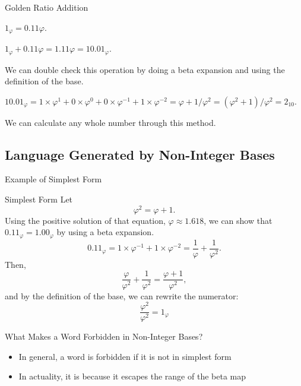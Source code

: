 \documentclass{beamer}
\begin{document}
\begin{frame}{Golden Ratio Addition}
  \begin{example}\pause
    $1_\varphi = 0.11\varphi.$\pause

    $1_\varphi + 0.11\varphi = 1.11\varphi = 10.01_\varphi.$\pause

    We can double check this operation by doing a beta expansion and using the definition of the base.\pause

    $10.01_\varphi = 1\times\varphi^1+0\times\varphi^0+0\times\varphi^{-1}+1\times\varphi^{-2}=\varphi + 1/\varphi^2 = (\varphi^2 + 1)/\varphi^2 = 2_{10}.$ \pause

    We can calculate any whole number through this method.
  \end{example}
\end{frame}










\subsection{Language Generated by Non-Integer Bases}
\begin{frame}{Example of Simplest Form}
  \begin{block}{Simplest Form}
    Let $$\varphi^2 = \varphi + 1.$$
    Using the positive solution of that equation, $\varphi \approx 1.618$, we can show that $0.11_\varphi = 1.00_\varphi$ by using a beta expansion.
    $$0.11_\varphi = 1\times\varphi^{-1} + 1\times\varphi^{-2} = \frac{1}{\varphi} + \frac{1}{\varphi^2}.$$
    Then,
    $$\frac{\varphi}{\varphi^2} + \frac{1}{\varphi^2} = \frac{\varphi+1}{\varphi^2},$$
    and by the definition of the base, we can rewrite the numerator:
    $$\frac{\varphi^2}{\varphi^2} = 1_\varphi$$
  \end{block}
\end{frame}

\begin{frame}{What Makes a Word Forbidden in Non-Integer Bases?}
  \begin{itemize}
    \item In general, a word is forbidden if it is not in simplest form \pause
    \item In actuality, it is because it escapes the range of the beta map
  \end{itemize}
\end{frame}
\end{document}
